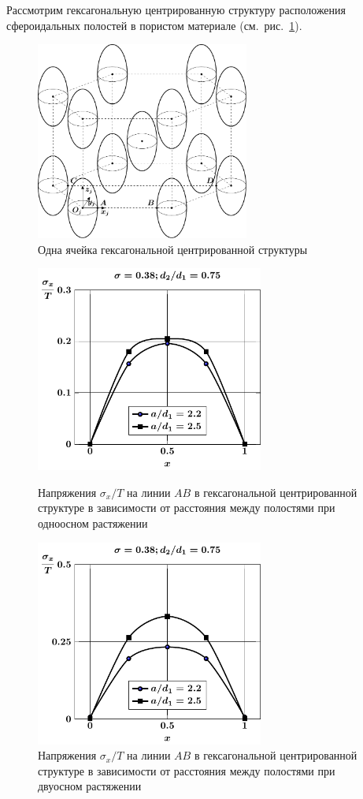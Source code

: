Рассмотрим гексагональную центрированную структуру расположения сфероидальных полостей в пористом материале (см.~рис.~\ref{f:9:43}).

\begin{figure}[h!]
\centering
\includegraphics[width=7cm]{cav-13.pdf}
\caption{Одна ячейка гексагональной центрированной структуры}
\label{f:9:43}
\end{figure}

\begin{figure}[h!]
\centering\footnotesize
\parbox[b]{7.5cm}{\centering\includegraphics[width=7.5cm]{cav13-a-d75-t1-sig_x.pdf}
\caption{Напряжения $\sigma_x/T$ на линии $AB$ в гексагональной центрированной структуре в зависимости от расстояния между полостями при одноосном растяжении 
\label{f:9:44}}}\hfil\hfil
\parbox[b]{7.5cm}{\centering\includegraphics[width=7.5cm]{cav13-a-d75-t2-sig_x.pdf}
\caption{Напряжения $\sigma_x/T$ на линии $AB$ в гексагональной центрированной структуре в зависимости от расстояния между полостями при двуосном растяжении
\label{f:9:45}}}
\end{figure}

